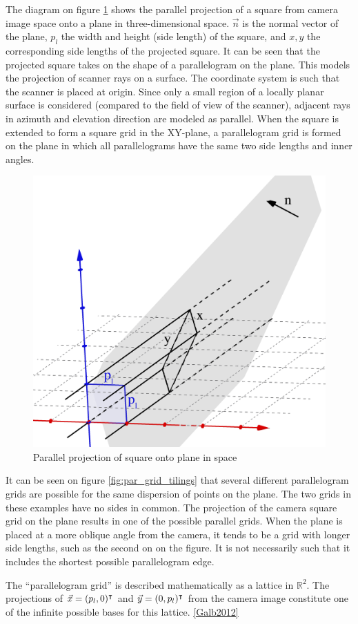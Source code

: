 The diagram on figure \ref{fig:pargrid_proj} shows the parallel projection of a square from camera image space onto a plane in three-dimensional space. $\vec{n}$ is the normal vector of the plane, $p_l$ the width and height (side length) of the square, and $x, y$ the corresponding side lengths of the projected square. It can be seen that the projected square takes on the shape of a parallelogram on the plane. This models the projection of scanner rays on a surface. The coordinate system is such that the scanner is placed at origin. Since only a small region of a locally planar surface is considered (compared to the field of view of the scanner), adjacent rays in azimuth and elevation direction are modeled as parallel. When the square is extended to form a square grid in the XY-plane, a parallelogram grid is formed on the plane in which all parallelograms have the same two side lengths and inner angles.

\begin{figure}[h]
\centering
\includegraphics[width=.4\textwidth]{fig/pargrid_proj.png}
\caption{Parallel projection of square onto plane in space}
\label{fig:pargrid_proj}
\end{figure}

It can be seen on figure \ref{fig:par_grid_tilings} that several different parallelogram grids are possible for the same dispersion of points on the plane. The two grids in these examples have no sides in common. The projection of the camera square grid on the plane results in one of the possible parallel grids. When the plane is placed at a more oblique angle from the camera, it tends to be a grid with longer side lengths, such as the second on on the figure. It is not necessarily such that it includes the shortest possible parallelogram edge.

The ``parallelogram grid'' is described mathematically as a lattice in $\mathbb{R}^2$. The projections of $\vec{x} = (p_l, 0)^\intercal$ and $\vec{y} = (0, p_l)^\intercal$ from the camera image constitute one of the infinite possible bases for this lattice. \ref{Galb2012}

